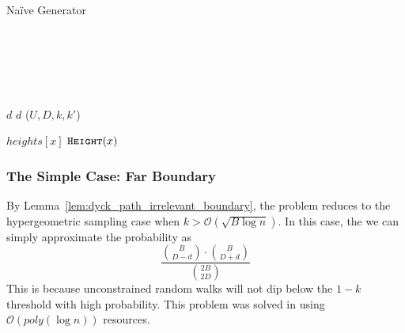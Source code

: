 \begin{algorithm}[H]
    \caption{Na\"{i}ve Generator}
    \begin{algorithmic}
            \\
            \\\\
            \\
            \\
                \State \Return $d$
            \EndIf
                \State \Return $d$
            \EndIf
            \Return {}($U, D, k, k'$)

        \EndProcedure
                \State \Return $heights[x]$
            \EndIf
            \State \Return $\texttt{\textsc{Height}}(x)$
        \EndProcedure
    \end{algorithmic}
    \label{alg:catalan_generator}
\end{algorithm}



\subsubsection{The Simple Case: Far Boundary}%
\label{sec:the_simple_case}
By Lemma~\ref{lem:dyck_path_irrelevant_boundary}, the problem reduces to the hypergeometric sampling case when $k>\mathcal{O}(\sqrt{B\log n})$.
In this case, the we can simply approximate the probability as
$$
\frac{{{B}\choose{D-d}}\cdot{{B}\choose{D+d}}}{{{2B}\choose{2D}}}
$$
This is because unconstrained random walks will not dip below the $1-k$ threshold with high probability.
This problem was solved in \cite{huge} using $\mathcal O(poly(\log n))$ resources.

